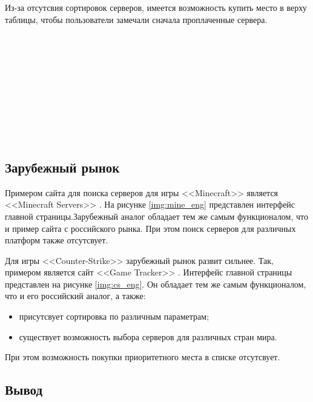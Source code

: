 Из-за отсутсвия сортировок серверов, имеется возможность купить место в верху таблицы, чтобы пользователи замечали сначала проплаченные сервера. 

~\\~\\~\\~\\~\\~\\~\\~\\~\\

\subsection{Зарубежный рынок}

Примером сайта для поиска серверов для игры <<Minecraft>> \cite{minecraft} является <<Minecraft Servers>> \cite{mine-servs}. На рисунке \ref{img:mine_eng} представлен интерфейс главной страницы.Зарубежный аналог обладает тем же самым функционалом, что и пример сайта с российского рынка. При этом поиск серверов для различных платформ также отсутсвует.

Для игры <<Counter-Strike>> \cite{cs} зарубежный рынок развит сильнее. Так, примером является сайт <<Game Tracker>> \cite{game-tracker}. Интерфейс главной страницы представлен на рисунке \ref{img:cs_eng}. Он обладает тем же самым функционалом, что и его российский аналог, а также:

\begin{itemize}
    \item присутсвует сортировка по различным параметрам;
    \item существует возможность выбора серверов для различных стран мира.
\end{itemize}

При этом возможность покупки приоритетного места в списке отсутсвует. 



\subsection*{Вывод}

